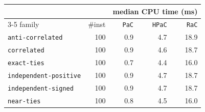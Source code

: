 \begin{tabular}{@{}lrrrr@{}}
\toprule
 &  & \multicolumn{3}{c}{median CPU time (ms)} \\
\cmidrule(l){3-5}
family & \#inst & \texttt{PaC} & \texttt{HPaC} & \texttt{RaC} \\
\midrule
\texttt{anti-correlated} & 100 & 0.9 & 4.7 & 18.9 \\
\texttt{correlated} & 100 & 0.9 & 4.6 & 18.7 \\
\texttt{exact-ties} & 100 & 0.7 & 4.4 & 16.0 \\
\texttt{independent-positive} & 100 & 0.9 & 4.7 & 18.7 \\
\texttt{independent-signed} & 100 & 0.9 & 4.7 & 18.7 \\
\texttt{near-ties} & 100 & 0.8 & 4.5 & 16.0 \\
\bottomrule
\end{tabular}
